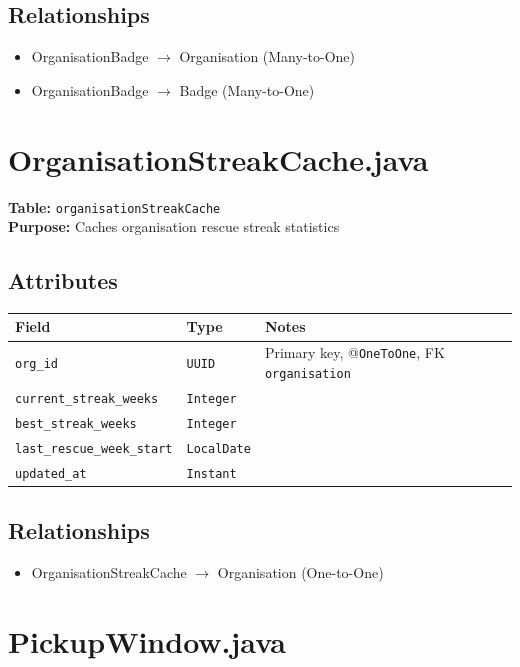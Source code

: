 \documentclass[a4paper,11pt]{article}
\begin{document}
\subsection*{Relationships}
\begin{itemize}
  \item OrganisationBadge $\rightarrow$ Organisation (Many-to-One)
  \item OrganisationBadge $\rightarrow$ Badge (Many-to-One)
\end{itemize}

\section{OrganisationStreakCache.java}

\textbf{Table:} \texttt{organisationStreakCache} \\
\textbf{Purpose:} Caches organisation rescue streak statistics \\

\subsection*{Attributes}
\begin{longtable}{|p{4cm}|p{3cm}|p{6cm}|}
\hline
\textbf{Field} & \textbf{Type} & \textbf{Notes} \\
\hline
\texttt{org\_id} & \texttt{UUID} & Primary key, @\texttt{OneToOne}, FK \texttt{organisation} \\
\texttt{current\_streak\_weeks} & \texttt{Integer} & \\
\texttt{best\_streak\_weeks} & \texttt{Integer} & \\
\texttt{last\_rescue\_week\_start} & \texttt{LocalDate} & \\
\texttt{updated\_at} & \texttt{Instant} &  \\
\hline
\end{longtable}

\subsection*{Relationships}
\begin{itemize}
  \item OrganisationStreakCache $\rightarrow$ Organisation (One-to-One)
\end{itemize}

\section{PickupWindow.java}
\end{document}
